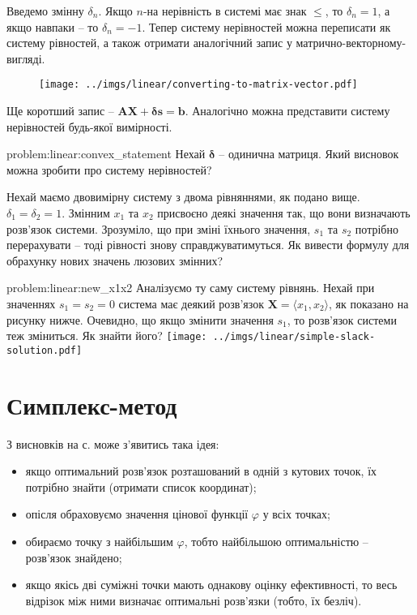 \documentclass[\main/book.tex]{subfiles}
\begin{document}
Введемо змінну $\delta_n$. Якщо $n$-на нерівність в системі має знак \flqq{}$\leq$\frqq{}, то $\delta_n=1$, а якщо навпаки -- то $\delta_n=-1$. Тепер систему нерівностей можна переписати як систему рівностей, а також отримати аналогічний запис у матрично-векторному-вигляді.

\begin{figure}[!h]
 \center
 \texttt{[image: ../imgs/linear/converting-to-matrix-vector.pdf]}
\end{figure}

Ще коротший запис -- $\mathbf{A} \mathbf{X} + \mathbf{\delta} \mathbf{s} = \mathbf{b}$. Аналогічно можна представити систему нерівностей будь-якої вимірності.

\begin{problem}{problem:linear:convex_statement}
 Нехай $\mathbf{\delta}$ -- одинична матриця. Який висновок можна зробити про систему нерівностей?
\end{problem}

\begin{question}
 Нехай маємо двовимірну систему з двома рівняннями, як подано вище. $\delta_1 = \delta_2 = 1$. Змінним $x_1$ та $x_2$ присвоєно деякі значення так, що вони визначають розв'язок системи. Зрозуміло, що при зміні їхнього значення, $s_1$ та $s_2$ потрібно перерахувати -- тоді рівності знову справджуватимуться. Як вивести формулу для обрахунку нових значень люзових змінних?
\end{question}

\begin{problem}{problem:linear:new_x1x2}
 Аналізуємо ту саму систему рівнянь. Нехай при значеннях $s_1 = s_2 = 0$ система має деякий розв'язок $\mathbf{X} = \langle x_1, x_2 \rangle$, як показано на рисунку нижче. Очевидно, що якщо змінити значення $s_1$, то розв'язок системи теж зміниться. Як знайти його?
 \center
 \texttt{[image: ../imgs/linear/simple-slack-solution.pdf]}
\end{problem}

\section{Симплекс-метод}
\label{section:linear:simplex}

З висновків на с. \pageref{conclusion:linear:optimal_solution} може з'явитись така ідея:

\begin{itemize}
 \item якщо оптимальний розв'язок розташований в одній з кутових точок, їх потрібно знайти (отримати список координат);
 \item опісля обраховуємо значення цінової функції $\varphi$ у всіх точках;
 \item обираємо точку з найбільшим $\varphi$, тобто найбільшою оптимальністю -- розв'язок знайдено;
 \item якщо якісь дві суміжні точки мають однакову оцінку ефективності, то весь відрізок між ними визначає оптимальні розв'язки (тобто, їх безліч).
\end{itemize}
\end{document}
